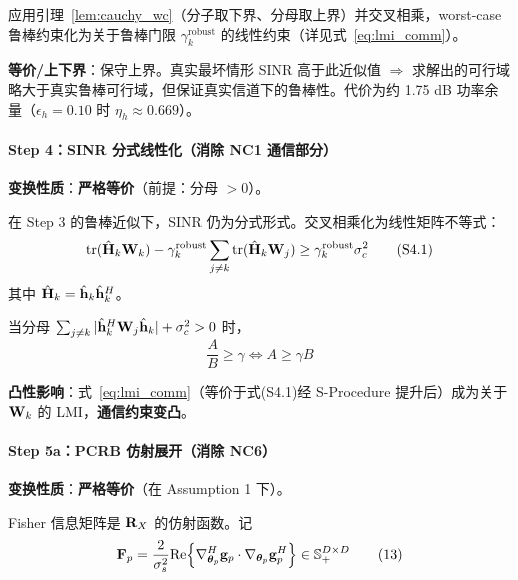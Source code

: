 应用引理~\ref{lem:cauchy_wc}（分子取下界、分母取上界）并交叉相乘，worst-case 鲁棒约束化为关于鲁棒门限 $\gamma_k^{\text{robust}}$ 的线性约束（详见式~\eqref{eq:lmi_comm}）。

\textbf{等价/上下界}：保守上界。真实最坏情形 SINR 高于此近似值 $\Rightarrow$ 求解出的可行域略大于真实鲁棒可行域，但保证真实信道下的鲁棒性。代价为约 1.75 dB 功率余量（$\epsilon_h=0.10$ 时 $\eta_h \approx 0.669$）。

\paragraph{Step 4：SINR 分式线性化（消除 NC1 通信部分）}
\textbf{变换性质}：\textbf{严格等价}（前提：分母 $> 0$）。

在 Step 3 的鲁棒近似下，SINR 仍为分式形式。交叉相乘化为线性矩阵不等式：
\begin{equation}
\text{tr}(\hat{\mathbf{H}}_k \mathbf{W}_k) - \gamma_k^{\text{robust}} \sum_{j\neq k} \text{tr}(\hat{\mathbf{H}}_k \mathbf{W}_j) \geq \gamma_k^{\text{robust}} \sigma_c^2 \tag{S4.1}
\end{equation}
其中 $\hat{\mathbf{H}}_k = \hat{\mathbf{h}}_k \hat{\mathbf{h}}_k^H$。

\begin{proposition}[分式线性化等价性]\label{prop:frac}
当分母 $\sum_{j\neq k}|\hat{\mathbf{h}}_k^H \mathbf{W}_j \hat{\mathbf{h}}_k| + \sigma_c^2 > 0$ 时，
\begin{equation}
\frac{A}{B} \geq \gamma \iff A \geq \gamma B
\end{equation}
\end{proposition}

\textbf{凸性影响}：式~\eqref{eq:lmi_comm}（等价于式(S4.1)经 S-Procedure 提升后）成为关于 $\mathbf{W}_k$ 的 LMI，\textbf{通信约束变凸}。

\paragraph{Step 5a：PCRB 仿射展开（消除 NC6）}
\textbf{变换性质}：\textbf{严格等价}（在 Assumption 1 下）。

Fisher 信息矩阵是 $\mathbf{R}_X$ 的仿射函数。记
\begin{equation}
\mathbf{F}_p = \frac{2}{\sigma_s^2} \text{Re}\Big\{ \nabla_{\boldsymbol{\theta}_p}^H \mathbf{g}_p \cdot \nabla_{\boldsymbol{\theta}_p} \mathbf{g}_p^H \Big\} \in \mathbb{S}_+^{D\times D} \tag{13}
\end{equation}

